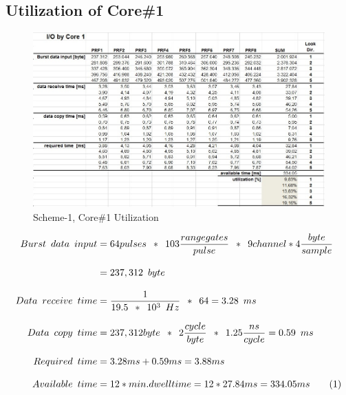 \subsection{Utilization of Core\#1}
\begin{figure}[h!]
	\centering
	\includegraphics[width=150mm]{figures/aa_scheme1_cpu_util_1}
	\caption{Scheme-1, Core\#1 Utilization}
	\label{fig:existing_analysis:aa_scheme1_cpu_util1}
\end{figure}
\begin{align*}
	\label{aa:scheme1:core1:equ}
	Burst \enspace data \enspace input & = 64 pulses \enspace * \enspace 103 \frac{range gates}{pulse} \enspace * \enspace 9channel * 4\frac{byte}{sample}\\[0.3cm]
	& = 237,312 \enspace byte \\[0.3cm]
	Data \enspace receive \enspace time &= \frac{1}{19.5 \enspace * \enspace 10^{3} \enspace Hz} \enspace * \enspace 64 = 3.28 \enspace ms \\[0.3cm]
	Data \enspace copy \enspace time &= 237,312 byte \enspace * \enspace 2\frac{cycle}{byte} \enspace * \enspace 1.25\frac{ns}{cycle} = 0.59 \enspace ms \\[0.3cm]
	Required \enspace time &= 3.28ms + 0.59ms =  3.88ms\\[0.3cm]
	Available \enspace time &= 12 * min.dwelltime = 12*27.84ms = 334.05ms \stepcounter{equation}\tag{\theequation} 
\end{align*}

